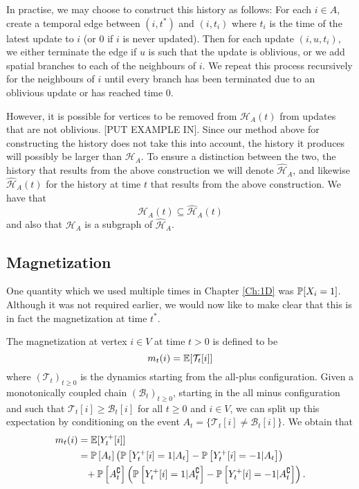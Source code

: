 In practise, we may choose to construct this history as follows: For each $i \in A$, create a temporal edge between $(i, t^*)$ and $(i, t_i)$ where $t_i$ is the time of the latest update to $i$ (or $0$ if $i$ is never updated). Then for each update $(i, u, t_i)$, we either terminate the edge if $u$ is such that the update is oblivious, or we add spatial branches to each of the neighbours of $i$. We repeat this process recursively for the neighbours of $i$ until every branch has been terminated due to an oblivious update or has reached time $0$.

However, it is possible for vertices to be removed from $\mathcal{H}_A(t)$ from updates that are not oblivious. [PUT EXAMPLE IN]. Since our method above for constructing the history does not take this into account, the history it produces will possibly be larger than $\mathcal{H}_A$. To ensure a distinction between the two, the history that results from the above construction we will denote $\hat{\mathcal{H}}_A$, and likewise $\hat{\mathcal{H}}_A(t)$ for the history at time $t$ that results from the above construction. We have that
\begin{equation}
	\mathcal{H}_A(t) \subseteq \hat{\mathcal{H}}_A(t)
\end{equation}
and also that $\mathcal{H}_A$ is a subgraph of $\hat{\mathcal{H}}_A$.

\subsection{Magnetization}
One quantity which we used multiple times in Chapter \ref{Ch:1D} was $\mathbb{P}[X_i = 1]$. Although it was not required earlier, we would now like to make clear that this is in fact the magnetization at time $t^*$. 

The magnetization at vertex $i \in V$ at time $t > 0$ is defined to be
\begin{equation}
	m_t(i) = \mathbb{E}[\mathcal{T}_t[i]]
\end{equation}
where $(\mathcal{T}_t)_{t \geq 0}$ is the dynamics starting from the all-plus configuration. %
Given a monotonically coupled chain $(\mathcal{B}_t)_{t\geq0}$, starting in the all minus configuration and such that $\mathcal{T}_t[i] \geq \mathcal{B}_t[i]$ for all $t\geq 0$ and $i \in V$, we can split up this expectation by conditioning on the event $A_t = \{\mathcal{T}_t[i] \neq \mathcal{B}_t[i]\}$. We obtain that
\begin{align}
	m_t(i) &= \mathbb{E}[Y_t^+[i]]\\
	&= \mathbb{P}\left[A_t\right] \left(\mathbb{P}\left[Y_t^+[i] = 1 | A_t\right] - \mathbb{P}\left[Y_t^+[i] = -1|A_t\right]\right)  \\
	&\phantom{= } + \mathbb{P}\left[A_t^\complement\right] \left( \mathbb{P}\left[Y_t^+[i] = 1 |A_t^\complement\right] - \mathbb{P}\left[Y_t^+[i] = -1|A_t^\complement\right] \right). \notag
\end{align}

